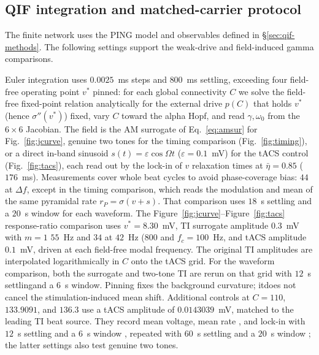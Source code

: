 \documentclass[11pt,a4paper]{article}
\newif\ifjne
\newcommand{\Sig}{\sigma}
\providecommand{\DIFaddtex}[1]{{\protect\color{blue} \sf #1}} %
\providecommand{\DIFdeltex}[1]{{\protect\color{red} \scriptsize #1}} %
\providecommand{\DIFaddbegin}{} %
\providecommand{\DIFaddend}{} %
\providecommand{\DIFdelbegin}{} %
\providecommand{\DIFdelend}{} %
\providecommand{\DIFadd}[1]{\texorpdfstring{\DIFaddtex{#1}}{#1}} %
\providecommand{\DIFdel}[1]{\texorpdfstring{\DIFdeltex{#1}}{}} %
\begin{document}
\ifjne\else
\subsection{\DIFadd{QIF integration and matched-carrier protocol}}\label{supp:qif-protocol}
\DIFadd{The finite network uses the PING model and observables defined in
\S\ref{sec:qif-methods}. The following settings support the weak-drive and
field-induced gamma comparisons.
}

\DIFadd{Euler integration uses $0.0025$~ms steps and $800$~ms settling, exceeding
four }\DIFaddend field-free \DIFdelbegin \DIFdel{operating point $v^*$ pinned: for each global connectivity $C$ we solve the field-free fixed-point relation analytically
for the external drive $p(C)$ that holds $v^*$ (hence $\Sig''(v^*)$) fixed, vary $C$
toward the alpha Hopf, and read $\gamma,\omega_0$ from the $6\times6$ Jacobian. The field
is the AM surrogate of Eq.~\eqref{eq:amsur} for Fig.~\ref{fig:jcurve}, genuine two
tones for the timing comparison (Fig.~\ref{fig:timing}), or a direct in-band sinusoid $s(t)=\varepsilon\cos\Omega t$
($\varepsilon=0.1$~mV) for the tACS control (Fig.~\ref{fig:tacs}),
each read out by the
lock-in of $v$ }\DIFdelend \DIFaddbegin \DIFadd{relaxation times at $\bar\eta=0.85$ ($176$~ms).
Measurements cover whole beat cycles to avoid phase-coverage bias:
$44$ }\DIFaddend at \DIFdelbegin \DIFdel{$\Delta f$, except in the timing comparison, which reads the
modulation and mean of the same pyramidal rate $r_P=\Sig(v+s)$.
That comparison uses $18$~s settling and a $20$~s window for each waveform.
The Figure~\ref{fig:jcurve}--Figure~\ref{fig:tacs} response-ratio comparison uses
$v^*=8.30$~mV, TI surrogate amplitude $0.3$~mV with $m=1$ }\DIFdelend \DIFaddbegin \DIFadd{$55$~Hz and $34$ at $42$~Hz ($800$ }\DIFaddend and \DIFdelbegin \DIFdel{$f_c=100$~Hz, and tACS amplitude $0.1$~mV,
driven at each field-free modal frequency.
The original TI amplitudes are interpolated logarithmically in $C$ onto the tACS
grid. For the waveform comparison, both the surrogate and two-tone TI are rerun
on that grid with $12$~s settlingand a $6$~s window. Pinning fixes the background curvature; itdoes not cancel the stimulation-induced
mean shift.
Additional controls at $C=110$, $133.9091$, and $136.3$ use a tACS amplitude of
$0.0143039$~mV, matched to the leading TI beat source. They record mean voltage,
mean rate , and lock-in with $12$~s settling and a $6$~s window , repeated with
$60$~s settling and a $20$~s window ; the latter settings also test genuine two tones.
}%
\end{document}
